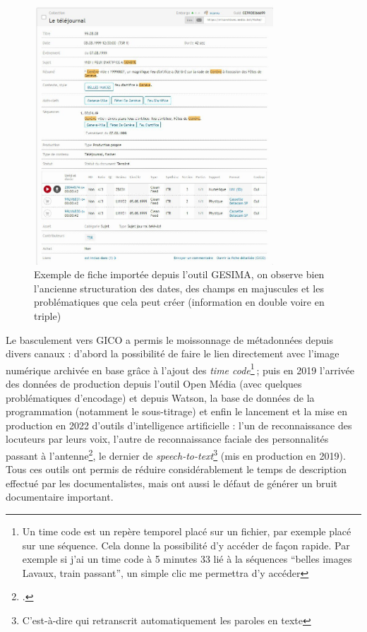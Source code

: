 \begin{figure}[h!]
	\centering
	\includegraphics[width=0.8\textwidth]{images/image1.png}
	\caption{Exemple de fiche importée depuis l'outil GESIMA, on observe bien l'ancienne structuration des dates, des champs en majuscules et les problématiques que cela peut créer (information en double voire en triple)}
	\label{fig:image1}
\end{figure}


Le basculement vers GICO a permis le moissonnage de métadonnées depuis divers canaux : d’abord la possibilité de faire le lien directement avec l’image numérique archivée en base grâce à l’ajout des \textit{time code}\footnote{Un time code est un repère temporel placé sur un fichier, par exemple placé sur une séquence. Cela donne la possibilité d'y accéder de façon rapide. Par exemple si j'ai un time code à 5 minutes 33 lié à la séquences \enquote{belles images Lavaux, train passant}, un simple clic me permettra d'y accéder} ; puis en 2019 l’arrivée des données de production depuis l’outil Open Média (avec quelques problématiques d’encodage) et depuis Watson, la base de données de la programmation (notamment le sous-titrage) et enfin le lancement et la mise en production en 2022 d’outils d’intelligence artificielle : l’un de reconnaissance des locuteurs par leurs voix, l’autre de reconnaissance faciale des personnalités passant à l’antenne\footcite{sonderegger2024}, le dernier de \textit{speech-to-text}\footnote{C'est-à-dire qui retranscrit automatiquement les paroles en texte} (mis en production en 2019). Tous ces outils ont permis de réduire considérablement le temps de description effectué par les documentalistes, mais ont aussi le défaut de générer un bruit documentaire important.


